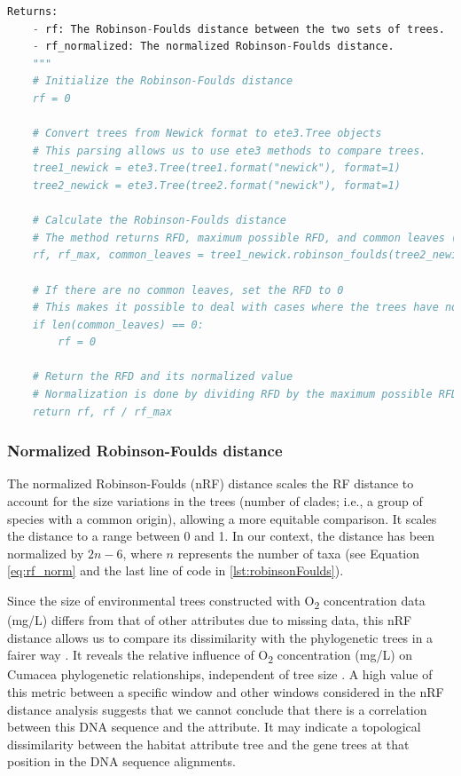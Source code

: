 {\begin{lstlisting}[label=lst:robinsonFoulds,language=Python,caption=Python script for calculating the Robinson-Foulds Distance using the ete3 package in the aPhyloGeo package.]
    Returns:
    - rf: The Robinson-Foulds distance between the two sets of trees.
    - rf_normalized: The normalized Robinson-Foulds distance.
    """
    # Initialize the Robinson-Foulds distance
    rf = 0

    # Convert trees from Newick format to ete3.Tree objects
    # This parsing allows us to use ete3 methods to compare trees.
    tree1_newick = ete3.Tree(tree1.format("newick"), format=1)
    tree2_newick = ete3.Tree(tree2.format("newick"), format=1)

    # Calculate the Robinson-Foulds distance
    # The method returns RFD, maximum possible RFD, and common leaves (i.e., a taxa) between the trees.
    rf, rf_max, common_leaves = tree1_newick.robinson_foulds(tree2_newick, unrooted_trees=True)

    # If there are no common leaves, set the RFD to 0
    # This makes it possible to deal with cases where the trees have no overlapping taxa.
    if len(common_leaves) == 0:
        rf = 0

    # Return the RFD and its normalized value
    # Normalization is done by dividing RFD by the maximum possible RFD.
    return rf, rf / rf_max
\end{lstlisting}

\subsubsection{Normalized Robinson-Foulds distance}\label{RFnorm}
The normalized Robinson-Foulds (nRF) distance scales the RF distance to account for the size variations in the trees (number of clades; i.e., a group of species with a common origin), allowing a more equitable comparison. It scales the distance to a range between 0 and 1. In our context, the distance has been normalized by $2n-6$, where $n$ represents the number of taxa (see Equation \eqref{eq:rf_norm} and the last line of code in \autoref{lst:robinsonFoulds}). 

Since the size of environmental trees constructed with O\textsubscript{2} concentration data (mg/L) differs from that of other attributes due to missing data, this nRF distance allows us to compare its dissimilarity with the phylogenetic trees in a fairer way \citep{tahiri2018new, koshkarov_phylogeography_2022}. It reveals the relative influence of O\textsubscript{2} concentration (mg/L) on Cumacea phylogenetic relationships, independent of tree size \citep{tahiri2018new, koshkarov_phylogeography_2022}. A high value of this metric between a specific window and other windows considered in the nRF distance analysis suggests that we cannot conclude that there is a correlation between this DNA sequence and the attribute. It may indicate a topological dissimilarity between the habitat attribute tree and the gene trees at that position in the DNA sequence alignments.

}
